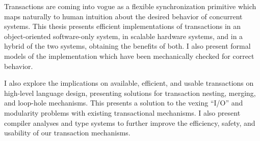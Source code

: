 
Transactions are coming into vogue as a flexible synchronization
primitive which maps naturally to human intuition about the desired
behavior of concurrent systems.  This thesis presents efficient
implementations of transactions in an object-oriented
software-only system, in scalable hardware systems, and in a hybrid
of the two systems, obtaining the benefits of both.  I also present
formal models of the implementation which have been mechanically
checked for correct behavior.

I also explore the implications on available, efficient, and usable
transactions on high-level language design, presenting solutions for
transaction nesting, merging, and loop-hole mechanisms.  This presents
a solution to the vexing ``I/O'' and modularity problems with
existing transactional mechanisms.  I also present compiler analyses
and type systems to further improve the efficiency, safety, and
usability of our transaction mechanisms.
